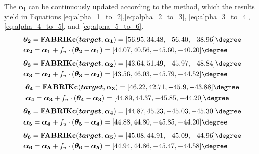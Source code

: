 The $\boldsymbol{\alpha_i}$ can be continuously updated according to the method, which the results yield in Equations 
\ref{eq:alpha_1_to_2},\ref{eq:alpha_2_to_3}, \ref{eq:alpha_3_to_4}, \ref{eq:alpha_4_to_5}, and \ref{eq:alpha_5_to_6}.
\begin{align}
    &\boldsymbol{\theta_2} = \textbf{FABRIKc}(\boldsymbol{target}, \boldsymbol{\alpha_1}) 
    = [56.95, 34.48, -56.40, -38.96]\degree \nonumber \\
    &\boldsymbol{\alpha_2} = \boldsymbol{\alpha_1} + f_u \cdot (\boldsymbol{\theta_2} - \boldsymbol{\alpha_1}) 
    = [44.07, 40.56, -45.60, -40.20]\degree
    \label{eq:alpha_1_to_2}
\end{align}
\vspace{-18mm}
\begin{align}
    &\boldsymbol{\theta_3} = \textbf{FABRIKc}(\boldsymbol{target}, \boldsymbol{\alpha_2}) 
    = [43.64, 51.49, -45.97, -48.84]\degree \nonumber \\
    &\boldsymbol{\alpha_3} = \boldsymbol{\alpha_2} + f_u \cdot (\boldsymbol{\theta_3} - \boldsymbol{\alpha_2}) 
    = [43.56, 46.03, -45.79, -44.52]\degree
    \label{eq:alpha_2_to_3}
\end{align}
\vspace{-18mm}
\begin{align}
    &\boldsymbol{\theta_4} = \textbf{FABRIKc}(\boldsymbol{target}, \boldsymbol{\alpha_3}) 
    = [46.22, 42.71, -45.9, -43.88]\degree \nonumber \\
    &\boldsymbol{\alpha_4} = \boldsymbol{\alpha_3} + f_u \cdot (\boldsymbol{\theta_4} - \boldsymbol{\alpha_3}) 
    = [44.89, 44.37, -45.85, -44.20]\degree
    \label{eq:alpha_3_to_4}
\end{align}
\vspace{-18mm}
\begin{align}
    &\boldsymbol{\theta_5} = \textbf{FABRIKc}(\boldsymbol{target}, \boldsymbol{\alpha_4}) 
    = [44.87, 45.23, -45.03, -45.30]\degree \nonumber \\
    &\boldsymbol{\alpha_5} = \boldsymbol{\alpha_4} + f_u \cdot (\boldsymbol{\theta_5} - \boldsymbol{\alpha_4}) 
    = [44.88, 44.80, -45.85, -44.20]\degree
    \label{eq:alpha_4_to_5}
\end{align}
\vspace{-18mm}
\begin{align}
    &\boldsymbol{\theta_6} = \textbf{FABRIKc}(\boldsymbol{target}, \boldsymbol{\alpha_5}) 
    = [45.08, 44.91, -45.09, -44.96]\degree \nonumber \\
    &\boldsymbol{\alpha_6} = \boldsymbol{\alpha_5} + f_u \cdot (\boldsymbol{\theta_6} - \boldsymbol{\alpha_5}) 
    = [44.94, 44.86, -45.47, -44.58]\degree
    \label{eq:alpha_5_to_6}
\end{align}

